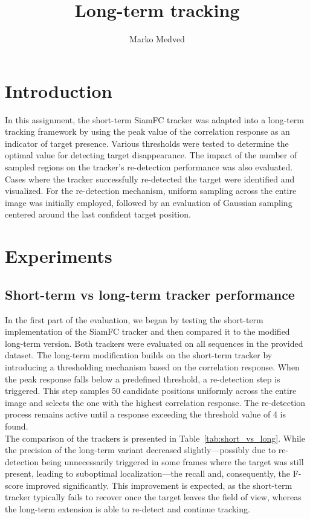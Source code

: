 \documentclass[9pt]{IEEEtran}
\title{\vspace{0ex}
Long-term tracking}
\author{Marko Medved\vspace{-4.0ex}}
\begin{document}
\maketitle

\section{Introduction}
In this assignment, the short-term 
SiamFC tracker was adapted into a 
long-term tracking framework by using 
the peak value of the correlation 
response as an indicator of target presence. Various thresholds were tested to determine the optimal value for detecting target disappearance. The impact of the number of sampled regions on the tracker’s re-detection performance was also evaluated. Cases where the tracker successfully re-detected the target were identified and visualized. For the re-detection mechanism, uniform sampling across the entire image was initially employed, followed by an evaluation of Gaussian sampling centered around the last confident target position.


\section{Experiments}
\subsection{Short-term vs long-term tracker performance}
In the first part of the evaluation, we began by testing the short-term
 implementation of the SiamFC tracker and then compared it to the modified
  long-term version. Both trackers were evaluated on all sequences in 
  the provided dataset. The long-term modification builds on the 
  short-term tracker by introducing a thresholding mechanism based 
  on the correlation response. When the peak response falls below a
   predefined threshold, a re-detection step is triggered. This step
   samples 50 candidate positions uniformly across the entire image 
   and selects the one with the highest correlation response. The 
   re-detection process remains active until a response exceeding 
   the threshold value of 4 is found. \\
   The comparison of the trackers is presented in
    Table~\ref{tab:short_vs_long}. While the precision of 
    the long-term variant decreased slightly—possibly due to
     re-detection being unnecessarily triggered in some frames 
     where the target was still present, leading to suboptimal 
     localization—the recall and, consequently, the F-score improved
      significantly. This improvement is expected, as the short-term
       tracker typically fails to recover once the target leaves the
        field of view, whereas the long-term extension is able to
         re-detect and continue tracking.  
\end{document}
